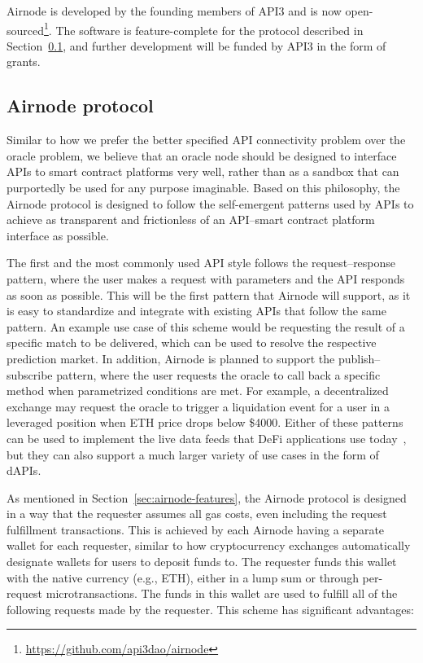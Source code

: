 \documentclass[11pt]{article}
\begin{document}
Airnode is developed by the founding members of API3 and is now open-sourced\footnote{\url{https://github.com/api3dao/airnode}}.
The software is feature-complete for the protocol described in Section~\ref{sec:airnode-protocol}, and further development will be funded by API3 in the form of grants.

\subsection{Airnode protocol}
\label{sec:airnode-protocol}

Similar to how we prefer the better specified API connectivity problem over the oracle problem, we believe that an oracle node should be designed to interface APIs to smart contract platforms very well, rather than as a sandbox that can purportedly be used for any purpose imaginable.
Based on this philosophy, the Airnode protocol is designed to follow the self-emergent patterns used by APIs to achieve as transparent and frictionless of an API--smart contract platform interface as possible.

The first and the most commonly used API style follows the request--response pattern, where the user makes a request with parameters and the API responds as soon as possible.
This will be the first pattern that Airnode will support, as it is easy to standardize and integrate with existing APIs that follow the same pattern.
An example use case of this scheme would be requesting the result of a specific match to be delivered, which can be used to resolve the respective prediction market.
In addition, Airnode is planned to support the publish--subscribe pattern, where the user requests the oracle to call back a specific method when parametrized conditions are met.
For example, a decentralized exchange may request the oracle to trigger a liquidation event for a user in a leveraged position when ETH price drops below \$4000.
Either of these patterns can be used to implement the live data feeds that DeFi applications use today~\cite{liu:2020}, but they can also support a much larger variety of use cases in the form of dAPIs.

As mentioned in Section~\ref{sec:airnode-features}, the Airnode protocol is designed in a way that the requester assumes all gas costs, even including the request fulfillment transactions.
This is achieved by each Airnode having a separate wallet for each requester, similar to how cryptocurrency exchanges automatically designate wallets for users to deposit funds to.
The requester funds this wallet with the native currency (e.g., ETH), either in a lump sum or through per-request microtransactions.
The funds in this wallet are used to fulfill all of the following requests made by the requester.
This scheme has significant advantages:
\end{document}
